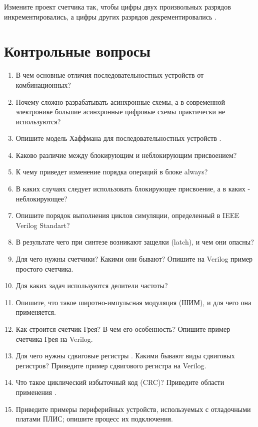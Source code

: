 \documentclass[a4paper,14pt]{article}
\begin{document}
	Измените проект счетчика так, чтобы цифры двух произвольных разрядов
	инкрементировались, а цифры других разрядов декрементировались .
			
	\section{Контрольные вопросы}
	
	\begin{enumerate}
		\item В чем основные отличия последовательностных устройств от комбинационных?
		
		\item Почему сложно разрабатывать асинхронные схемы, а в современной электронике
		большие асинхронные цифровые схемы практически не используются?
		
		\item Опишите модель Хаффмана для последовательностных устройств .
		
		\item Каково различие между блокирующим и неблокирующим присвоением?
		
		\item К чему приведет изменение порядка операций в блоке always?
		
		\item В каких случаях следует использовать блокирующее присвоение, а в каких - неблокирующее?
		
		\item Опишите порядок выполнения циклов симуляции, определенный в IEEE Verilog	Standart?
		
		\item В результате чего при синтезе возникают защелки (latch), и чем они опасны?
		
		\item Для чего нужны счетчики? Какими они бывают? Опишите на Verilog пример простого
		счетчика.
		
		\item Для каких задач используются делители частоты?
			
		\item Опишите, что такое широтно-импульсная модуляция (ШИМ), и для чего она
		применяется.
		
		\item Как строится счетчик Грея? В чем его особенность? Опишите пример счетчика Грея на
		Verilog.
		
		\item Для чего нужны сдвиговые регистры . Какими бывают виды сдвиговых регистров?
		Приведите пример сдвигового регистра на Verilog.
		
		\item Что такое циклический избыточный код (CRC)? Приведите области применения .
		
		\item Приведите примеры периферийных устройств, используемых с отладочными платами
		ПЛИС; опишите процесс их подключения.
	\end{enumerate}
	
\end{document}
